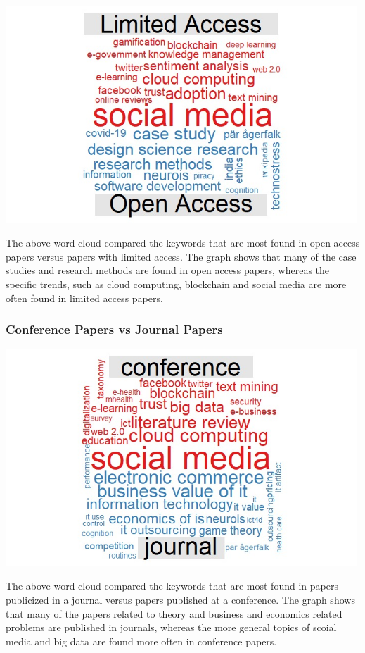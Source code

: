 \documentclass[
  letterpaper,
  DIV=11,
  numbers=noendperiod]{scrartcl}
\begin{document}
\includegraphics[width=5.20833in,height=\textheight]{images/authorsLimitedvsOpen-01.jpg}

The above word cloud compared the keywords that are most found in open
access papers versus papers with limited access. The graph shows that
many of the case studies and research methods are found in open access
papers, whereas the specific trends, such as cloud computing, blockchain
and social media are more often found in limited access papers.

\hypertarget{conference-papers-vs-journal-papers}{%
\subsubsection{Conference Papers vs Journal
Papers}\label{conference-papers-vs-journal-papers}}

\includegraphics[width=5.20833in,height=\textheight]{images/authorsConferencevsJournal-01.jpg}

The above word cloud compared the keywords that are most found in papers
publicized in a journal versus papers published at a conference. The
graph shows that many of the papers related to theory and business and
economics related problems are published in journals, whereas the more
general topics of scoial media and big data are found more often in
conference papers.
\end{document}
